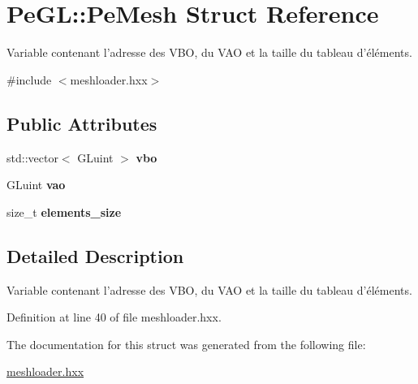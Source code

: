 \hypertarget{structPeGL_1_1PeMesh}{\section{Pe\-G\-L\-:\-:Pe\-Mesh Struct Reference}
\label{structPeGL_1_1PeMesh}
}


Variable contenant l'adresse des V\-B\-O, du V\-A\-O et la taille du tableau d'éléments.  




{\ttfamily \#include $<$meshloader.\-hxx$>$}

\subsection*{Public Attributes}
\begin{DoxyCompactItemize}
\item 
\hypertarget{structPeGL_1_1PeMesh_a04ac47a3c8f8bb828aa62a53ae78d9b8}{std\-::vector$<$ G\-Luint $>$ {\bfseries vbo}}\label{structPeGL_1_1PeMesh_a04ac47a3c8f8bb828aa62a53ae78d9b8}

\item 
\hypertarget{structPeGL_1_1PeMesh_aa3330a414cccc5540b6e92f064f4e3cd}{G\-Luint {\bfseries vao}}\label{structPeGL_1_1PeMesh_aa3330a414cccc5540b6e92f064f4e3cd}

\item 
\hypertarget{structPeGL_1_1PeMesh_a8062d6ebedf6efb5d77455a9ad403353}{size\-\_\-t {\bfseries elements\-\_\-size}}\label{structPeGL_1_1PeMesh_a8062d6ebedf6efb5d77455a9ad403353}

\end{DoxyCompactItemize}


\subsection{Detailed Description}
Variable contenant l'adresse des V\-B\-O, du V\-A\-O et la taille du tableau d'éléments. 

Definition at line 40 of file meshloader.\-hxx.



The documentation for this struct was generated from the following file\-:\begin{DoxyCompactItemize}
\item 
\hyperlink{meshloader_8hxx}{meshloader.\-hxx}\end{DoxyCompactItemize}
